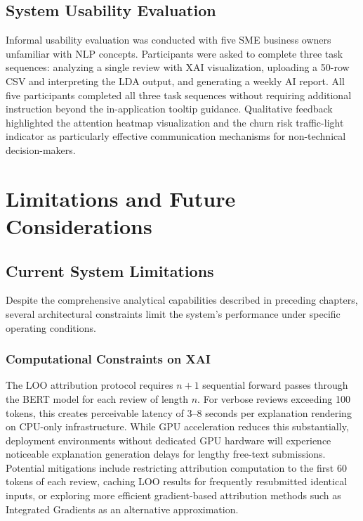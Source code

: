 \documentclass[12pt,a4paper]{report}
\begin{document}
\section{System Usability Evaluation}
Informal usability evaluation was conducted with five SME business owners unfamiliar with NLP concepts. Participants were asked to complete three task sequences: analyzing a single review with XAI visualization, uploading a 50-row CSV and interpreting the LDA output, and generating a weekly AI report. All five participants completed all three task sequences without requiring additional instruction beyond the in-application tooltip guidance. Qualitative feedback highlighted the attention heatmap visualization and the churn risk traffic-light indicator as particularly effective communication mechanisms for non-technical decision-makers.

\chapter{Limitations and Future Considerations}

\section{Current System Limitations}
Despite the comprehensive analytical capabilities described in preceding chapters, several architectural constraints limit the system's performance under specific operating conditions.

\subsection{Computational Constraints on XAI}
The LOO attribution protocol requires $n+1$ sequential forward passes through the BERT model for each review of length $n$. For verbose reviews exceeding 100 tokens, this creates perceivable latency of 3--8 seconds per explanation rendering on CPU-only infrastructure. While GPU acceleration reduces this substantially, deployment environments without dedicated GPU hardware will experience noticeable explanation generation delays for lengthy free-text submissions. Potential mitigations include restricting attribution computation to the first 60 tokens of each review, caching LOO results for frequently resubmitted identical inputs, or exploring more efficient gradient-based attribution methods such as Integrated Gradients as an alternative approximation.
\end{document}
